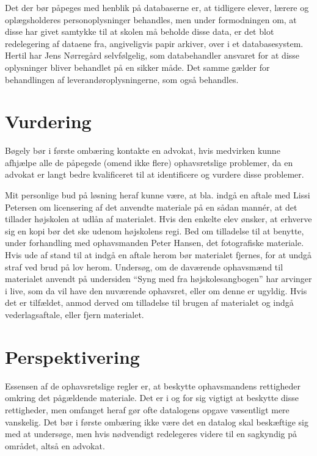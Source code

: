 \documentclass[a4paper]{article}
\begin{document}
Det der bør påpeges med henblik på databaserne er, at tidligere elever,
lærere og oplægsholderes personoplysninger behandles, men under formodningen
om, at disse har givet samtykke til at skolen må beholde disse data, er det
blot redelegering af dataene fra, angiveligvis papir arkiver, over i et
databasesystem. Hertil har Jens Nørregård selvfølgelig, som databehandler
ansvaret for at disse oplysninger bliver behandlet på en sikker måde. Det
samme gælder for behandlingen af leverandøroplysningerne, som også behandles.

\newpage
\section{Vurdering}
Bøgely bør i første ombæring kontakte en advokat, hvis medvirken kunne
afhjælpe alle de påpegede (omend ikke flere) ophavsretslige problemer, da en
advokat er langt bedre kvalificeret til at identificere og vurdere disse
problemer.

Mit personlige bud på løsning heraf kunne være, at bla. indgå en aftale med
Lissi Petersen om licensering af det anvendte materiale på en sådan mannér, at
det tillader højskolen at udlån af materialet. Hvis den enkelte elev ønsker,
at erhverve sig en kopi bør det ske udenom højskolens regi. Bed om tilladelse
til at benytte, under forhandling med ophavsmanden Peter Hansen, det
fotografiske materiale. Hvis ude af stand til at indgå en aftale herom bør
materialet fjernes, for at undgå straf ved brud på lov herom. Undersøg, om de
daværende ophavsmænd til materialet anvendt på undersiden ``Syng med fra
højskolesangbogen'' har arvinger i live, som da vil have den nuværende
ophavsret, eller om denne er ugyldig. Hvis det er tilfældet, anmod derved om
tilladelse til brugen af materialet og indgå vederlagsaftale, eller fjern
materialet.

\section{Perspektivering}
Essensen af de ophavsretslige regler er, at beskytte ophavsmandens rettigheder
omkring det pågældende materiale. Det er i og for sig vigtigt at beskytte
disse rettigheder, men omfanget heraf gør ofte datalogens opgave væsentligt
mere vanskelig. Det bør i første ombæring ikke være det en datalog skal
beskæftige sig med at undersøge, men hvis nødvendigt redelegeres videre til en
sagkyndig på området, altså en advokat.
\end{document}
